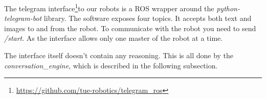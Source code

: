 \label{ssec:telegram}
The telegram interface\footnote{\url{https://github.com/tue-robotics/telegram_ros}}to our robots is a ROS wrapper around the \emph{python-telegram-bot} library. The software exposes four topics. It accepts both text and images to and from the robot. To communicate with the robot you need to send \textit{/start}. As the interface allows only one master of the robot at a time.

The interface itself doesn't contain any reasoning. This is all done by the \emph{conversation\_engine}, which is described in the following subsection.
